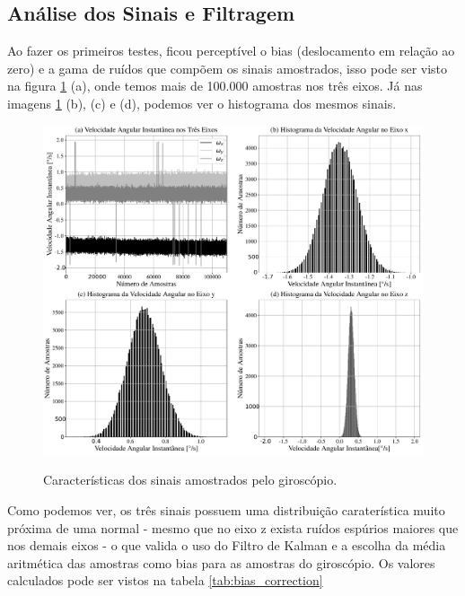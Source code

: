 
\subsection{Análise dos Sinais e Filtragem}

Ao fazer os primeiros testes, ficou perceptível o bias (deslocamento em relação ao zero) e a gama de ruídos que compõem os sinais amostrados, isso pode ser visto na figura \ref{fig:bias_correction} (a), onde temos mais de 100.000 amostras nos três eixos. Já nas imagens \ref{fig:bias_correction} (b), (c) e (d), podemos ver o histograma dos mesmos sinais.

\begin{figure}[H]
  \caption{Características dos sinais amostrados pelo giroscópio.}
      \includegraphics[scale=.4]{metodologia/img/bias_correction}
  \label{fig:bias_correction}
\end{figure}

Como podemos ver, os três sinais possuem uma distribuição caraterística muito próxima de uma normal - mesmo que no eixo z exista ruídos espúrios maiores que nos demais eixos - o que valida o uso do Filtro de Kalman e a escolha da média aritmética das amostras como bias para as amostras do giroscópio. Os valores calculados pode ser vistos na tabela \ref{tab:bias_correction} 

